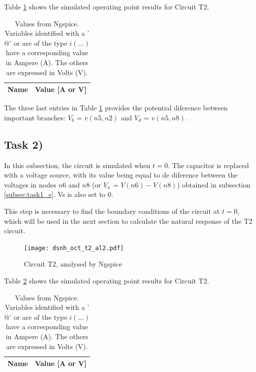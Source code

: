 Table \ref{tab:op1} shows the simulated operating point results for Circuit T2.

\begin{table}[ht]
	\centering
	\begin{tabular}{|l|r|}
		\hline    
		{\bf Name} & {\bf Value [A or V]} \\ \hline
    		
	\end{tabular}
	
	\caption{Values from Ngspice. Variables identified with a '$@$' or are of the type
	$i(...)$ have a corresponding value in Ampere (A). The others are expressed in Volts (V).}
    
\label{tab:op1}
\end{table}

The three last entries in Table \ref{tab:op1} provides the potential diference between important
branches: $V_b$ = $v(n5,n2)$ and $V_d$ = $v(n5,n8)$.


\subsection{Task 2)}
\label{subsec:task2_s}


In this subsection, the circuit is simulated when $t=0$. The capacitor is replaced with a voltage source, 
with its value being equal to de diference between the voltages in nodes $n6$ and $n8$ (or $V_x$ = $V(n6)-
V(n8)$) obtained in subsection \ref{subsec:task1_s}. Vs is also set to 0.

This step is necessary to find the boundary conditions of the circuit at $t=0$, which will be used in the next section to calculate the natural response of the T2 circuit.

\begin{figure}[ht]
	\centering
	\texttt{[image: dsnh\_oct\_t2\_al2.pdf]}
	\caption{Circuit T2, analysed by Ngspice}
\label{fig:Dsnh_sim_t2}
\end{figure}

Table \ref{tab:op2} shows the simulated operating point results for Circuit T2.

\begin{table}[ht]
	\centering
	\begin{tabular}{|l|r|}
		\hline    
		{\bf Name} & {\bf Value [A or V]} \\ \hline
    		
	\end{tabular}
	
	\caption{Values from Ngspice. Variables identified with a '$@$' or are of the type
	$i(...)$ have a corresponding value in Ampere (A). The others are expressed in Volts (V).}
    
\label{tab:op2}
\end{table}


